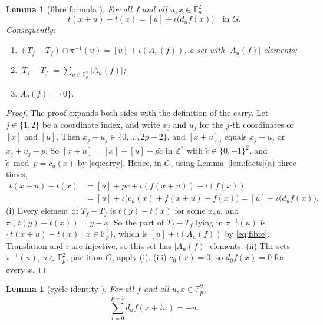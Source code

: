 \documentclass[11pt]{amsart}
\newtheorem{lemma}[theorem]{Lemma}
\theoremstyle{definition}\newtheorem{definition}[theorem]{Definition}
\theoremstyle{remark}\newtheorem{remark}[theorem]{Remark}
\newcommand{\F}{\mathbb{F}}
\newcommand{\Z}{\mathbb{Z}}
\newcommand{\abs}[1]{\lvert #1\rvert}
\begin{document}
\begin{lemma}[fibre formula {\cite[Lemma~6.1]{BPT}}]\label{lem:fibre}
For all \(f\) and all \(u,x\in\F_p^2\),
\begin{equation}\label{eq:fibre}
t(x+u)-t(x)=[u]+\iota\bigl(d_uf(x)\bigr)\quad\text{in }G .
\end{equation}
Consequently:
\begin{enumerate}
\item[(i)] \((T_f-T_f)\cap\pi^{-1}(u)=[u]+\iota(A_u(f))\), a set with \(\abs{A_u(f)}\) elements;
\item[(ii)] \(\abs{T_f-T_f}=\sum_{u\in\F_p^2}\abs{A_u(f)}\);
\item[(iii)] \(A_0(f)=\{0\}\).
\end{enumerate}
\end{lemma}

\begin{proof}
The proof expands both sides with the definition of the carry.
Let \(j\in\{1,2\}\) be a coordinate index, and write \(x_j\) and \(u_j\) for the \(j\)-th coordinates of \([x]\) and \([u]\).
Then \(x_j+u_j\in\{0,\dots,2p-2\}\), and \([x+u]_j\) equals \(x_j+u_j\) or \(x_j+u_j-p\).
So \([x+u]=[x]+[u]+p\tilde c\) in \(\Z^2\) with \(\tilde c\in\{0,-1\}^2\), and \(\tilde c\bmod p=c_u(x)\) by \eqref{eq:carry}.
Hence, in \(G\), using Lemma~\ref{lem:facts}(a) three times,
\begin{align*}
t(x+u)-t(x)&=[u]+p\tilde c+\iota(f(x+u))-\iota(f(x))\\
&=[u]+\iota\bigl(c_u(x)+f(x+u)-f(x)\bigr)=[u]+\iota\bigl(d_uf(x)\bigr).
\end{align*}
(i) Every element of \(T_f-T_f\) is \(t(y)-t(x)\) for some \(x,y\), and \(\pi(t(y)-t(x))=y-x\).
So the part of \(T_f-T_f\) lying in \(\pi^{-1}(u)\) is \(\{t(x+u)-t(x)\mid x\in\F_p^2\}\), which is \([u]+\iota(A_u(f))\) by \eqref{eq:fibre}.
Translation and \(\iota\) are injective, so this set has \(\abs{A_u(f)}\) elements.
(ii) The sets \(\pi^{-1}(u)\), \(u\in\F_p^2\), partition \(G\); apply (i).
(iii) \(c_0(x)=0\), so \(d_0f(x)=0\) for every \(x\).
\end{proof}

\begin{lemma}[cycle identity {\cite[Lemma~6.3]{BPT}}]\label{lem:cycle}
For all \(f\) and all \(u,x\in\F_p^2\),
\begin{equation}\label{eq:cycle}
\sum_{i=0}^{p-1}d_uf(x+iu)=-u .
\end{equation}
\end{lemma}
\end{document}
